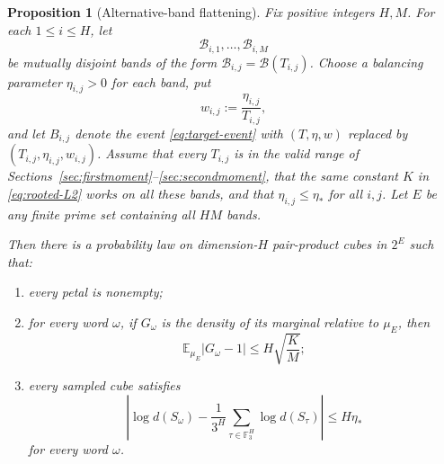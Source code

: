 \documentclass[11pt]{article}
\numberwithin{equation}{section}
\theoremstyle{plain}
\newtheorem{proposition}[theorem]{Proposition}
\newcommand{\F}{\mathbb F}
\newcommand{\E}{\mathbb E}
\newcommand{\1}{\mathbf 1}
\newcommand{\cB}{\mathcal B}
\begin{document}
\begin{proposition}[Alternative-band flattening]
\label{prop:alternative-bands}
Fix positive integers $H,M$.  For each $1\le i\le H$, let
\[
 \cB_{i,1},\ldots,\cB_{i,M}
\]
be mutually disjoint bands of the form
$\cB_{i,j}=\cB(T_{i,j})$.  Choose a balancing parameter
$\eta_{i,j}>0$ for each band, put
\begin{equation}\label{eq:alternative-band-data}
 w_{i,j}:=\frac{\eta_{i,j}}{T_{i,j}},
\end{equation}
and let $B_{i,j}$ denote the event \eqref{eq:target-event} with
$(T,\eta,w)$ replaced by
$(T_{i,j},\eta_{i,j},w_{i,j})$.  Assume that every $T_{i,j}$ is in the
valid range of Sections~\ref{sec:firstmoment}--\ref{sec:secondmoment}, that
the same constant $K$ in \eqref{eq:rooted-L2} works on all these bands, and
that $\eta_{i,j}\le\eta_*$ for all $i,j$.  Let $E$ be any finite prime set
containing all $HM$ bands.

Then there is a probability law on dimension-$H$ pair-product cubes in
$2^E$ such that:
\begin{enumerate}[label=(\roman*)]
 \item every petal is nonempty;
 \item for every word $\omega$, if $G_\omega$ is the density of its
       marginal relative to $\mu_E$, then
       \begin{equation}\label{eq:flattened-L1}
        \E_{\mu_E}|G_\omega-1|
        \le H\sqrt{\frac KM};
       \end{equation}
 \item every sampled cube satisfies
       \begin{equation}\label{eq:flattened-balance}
        \left|
        \log d(S_\omega)
        -\frac1{3^H}\sum_{\tau\in\F_3^H}\log d(S_\tau)
        \right|
        \le H\eta_*
       \end{equation}
       for every word $\omega$.
\end{enumerate}
\end{proposition}
\end{document}
